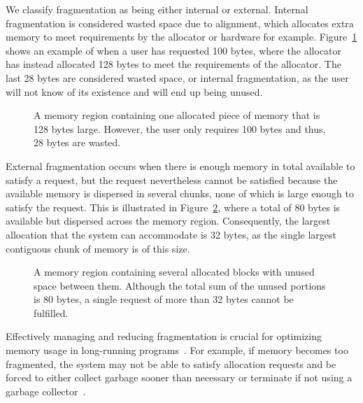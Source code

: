 
We classify fragmentation as being either internal or external. Internal fragmentation is considered wasted space due to alignment, which allocates extra memory to meet requirements by the allocator or hardware for example. Figure~\ref{fig:internal_fragmentation} shows an example of when a user has requested 100 bytes, where the allocator has instead allocated 128 bytes to meet the requirements of the allocator. The last 28 bytes are considered wasted space, or internal fragmentation, as the user will not know of its existence and will end up being unused.

\begin{figure}[h]
    \centering
    \vspace*{0.2cm}
    
    \vspace*{0.2cm}
    \caption{A memory region containing one allocated piece of memory that is 128 bytes large. However, the user only requires 100 bytes and thus, 28 bytes are wasted.}
    \label{fig:internal_fragmentation}
\end{figure}

External fragmentation occurs when there is enough memory in total available to satisfy a request, but the request nevertheless cannot be satisfied because the available memory is dispersed in several chunks, none of which is large enough to satisfy the request. This is illustrated in Figure~\ref{fig:external_fragmentation}, where a total of 80 bytes is available but dispersed across the memory region. Consequently, the largest allocation that the system can accommodate is 32 bytes, as the single largest contiguous chunk of memory is of this size.

\begin{figure}[h]
    \centering
    \vspace*{0.2cm}
    \hspace*{1.2cm}
    
    \vspace*{0.2cm}
    \caption{A memory region containing several allocated blocks with unused space between them. Although the total sum of the unused portions is 80 bytes, a single request of more than 32 bytes cannot be fulfilled.}
    \label{fig:external_fragmentation}
\end{figure}

Effectively managing and reducing fragmentation is crucial for optimizing memory usage in long-running programs~\cite{gchandbook}. For example, if memory becomes too fragmented, the system may not be able to satisfy allocation requests and be forced to either collect garbage sooner than necessary or terminate if not using a garbage collector~\cite{gchandbook}.


